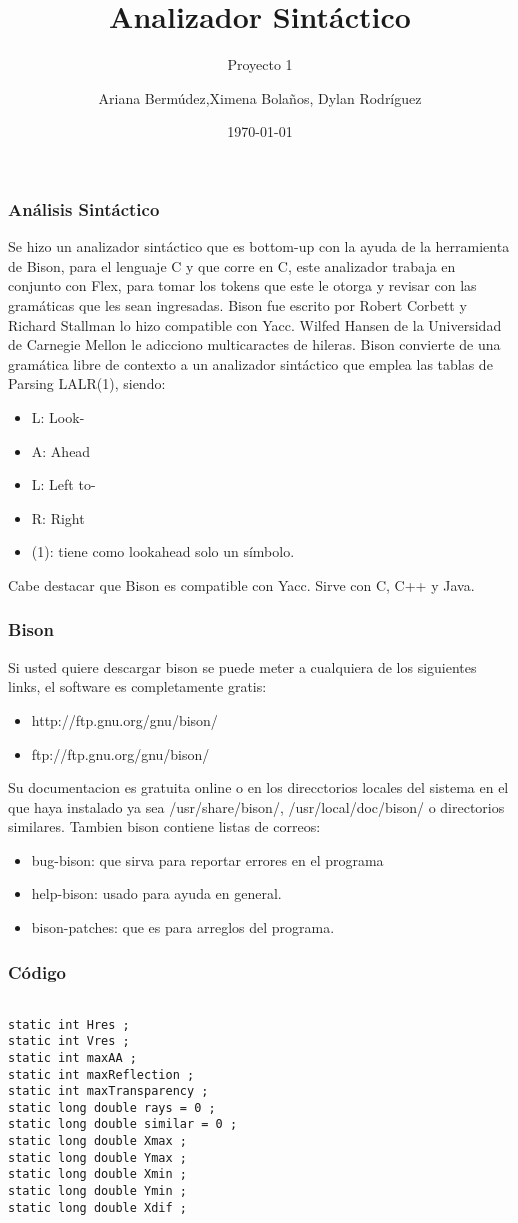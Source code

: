 \documentclass{beamer}
\title{Analizador Sint\'actico}
\subtitle{Proyecto 1}
\author{Ariana Berm\'udez,Ximena Bola\~nos, Dylan Rodr\'iguez}
\institute{Instituto Tecnol\'ogico de Costa Rica}
\date{\today}
\begin{document}
\begin{frame}
 \titlepage 
 \end{frame}\begin{frame}
 \frametitle{An\'alisis Sint\'actico}
  Se hizo un analizador sint\'actico que es bottom-up con la ayuda de la herramienta de Bison, para el lenguaje C y que corre en C, este analizador trabaja en conjunto con Flex, para tomar los tokens que este le otorga y revisar con las gram\'aticas que les sean ingresadas. Bison fue escrito por Robert Corbett y Richard Stallman lo hizo compatible con Yacc. Wilfed Hansen de la Universidad de Carnegie Mellon le adicciono multicaractes de hileras. Bison convierte de una gram\'atica libre de contexto a un analizador sint\'actico que emplea las tablas de Parsing LALR(1), siendo: \begin{itemize} \item L: Look- \item A: Ahead \item L: Left to- \item R: Right \item (1): tiene como lookahead solo un s\'imbolo. \end{itemize} Cabe destacar que Bison es compatible con Yacc. Sirve con C, C++ y Java. \end{frame}\begin{frame}
 \frametitle{Bison}
  Si usted quiere descargar bison se puede meter a cualquiera de los siguientes links, el software es completamente gratis: \begin{itemize} \item http://ftp.gnu.org/gnu/bison/ \item ftp://ftp.gnu.org/gnu/bison/ \end{itemize} Su documentacion es gratuita online  o en los direcctorios locales del sistema en el que haya instalado ya sea /usr/share/bison/, /usr/local/doc/bison/ o directorios similares. Tambien bison contiene listas de correos: \begin{itemize} \item bug-bison: que sirva para reportar errores en el programa \item help-bison: usado para ayuda en general. \item bison-patches: que es para arreglos del programa. \end{itemize} \end{frame} \begin{frame}[fragile]
\frametitle{C\'odigo}
\begin{verbatim}

static int Hres ; 
static int Vres ; 
static int maxAA ; 
static int maxReflection ; 
static int maxTransparency ; 
static long double rays = 0 ; 
static long double similar = 0 ; 
static long double Xmax ; 
static long double Ymax ; 
static long double Xmin ; 
static long double Ymin ; 
static long double Xdif ; 
\end{verbatim}
\end{frame}
\end{document}
